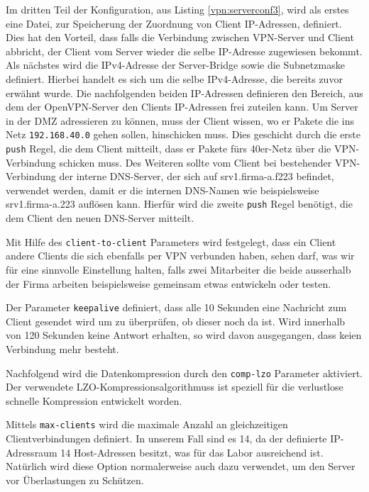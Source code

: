

Im dritten Teil der Konfiguration, aus Listing \ref{vpn:serverconf3}, wird als erstes eine Datei, zur Speicherung der Zuordnung von Client IP-Adressen, definiert. Dies hat den Vorteil, dass falls die Verbindung zwischen VPN-Server und Client abbricht, der Client vom Server wieder die selbe IP-Adresse zugewiesen bekommt. Als nächstes wird die IPv4-Adresse der Server-Bridge sowie die Subnetzmaske definiert. Hierbei handelt es sich um die selbe IPv4-Adresse, die bereits zuvor erwähnt wurde. Die nachfolgenden beiden IP-Adressen definieren den Bereich, aus dem der OpenVPN-Server den Clients IP-Adressen frei zuteilen kann. Um Server in der DMZ adressieren zu können, muss der Client wissen, wo er Pakete die ins Netz \texttt{192.168.40.0} gehen sollen, hinschicken muss. Dies geschicht durch die erste \texttt{push} Regel, die dem Client mitteilt, dass er Pakete fürs 40er-Netz über die VPN-Verbindung schicken muss.
Des Weiteren sollte vom Client bei bestehender VPN-Verbindung der interne DNS-Server, der sich auf srv1.firma-a.f223 befindet, verwendet werden, damit er die internen DNS-Namen wie beispielsweise srv1.firma-a.223 auflösen kann. Hierfür wird die zweite \texttt{push} Regel benötigt, die dem Client den neuen DNS-Server mitteilt.

Mit Hilfe des \texttt{client-to-client} Parameters wird festgelegt, dass ein Client andere Clients die sich ebenfalls per VPN verbunden haben, sehen darf, was wir für eine sinnvolle Einstellung halten, falls zwei Mitarbeiter die beide ausserhalb der Firma arbeiten beispielsweise gemeinsam etwas entwickeln oder testen.

Der Parameter \texttt{keepalive} definiert, dass alle 10 Sekunden eine Nachricht zum Client gesendet wird um zu überprüfen, ob dieser noch da ist. Wird innerhalb von 120 Sekunden keine Antwort erhalten, so wird davon ausgegangen, dass keien Verbindung mehr besteht.

Nachfolgend wird die Datenkompression durch den \texttt{comp-lzo} Parameter aktiviert. Der verwendete LZO-Kompressionsalgorithmuss ist speziell für die verlustlose schnelle Kompression entwickelt worden.

Mittels \texttt{max-clients} wird die maximale Anzahl an gleichzeitigen Clientverbindungen definiert. In unserem Fall sind es 14, da der definierte IP-Adressraum 14 Host-Adressen besitzt, was für das Labor ausreichend ist. Natürlich wird diese Option normalerweise auch dazu verwendet, um den Server vor Überlastungen zu Schützen.

